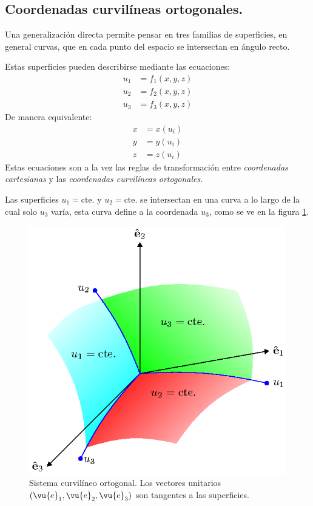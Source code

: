 \subsection{Coordenadas curvilíneas ortogonales.}

Una generalización directa permite pensar en tres familias de superficies, en general curvas, que en cada punto del espacio se intersectan en ángulo recto.
\par
Estas superficies pueden describirse mediante las ecuaciones:
\begin{align*}
u_{1} &= f_{1}(x, y, z) \\
u_{2} &= f_{2}(x, y, z) \\
u_{3} &= f_{3}(x, y, z)
\end{align*}
De manera equivalente:
\begin{align*}
x &= x(u_{i}) \\
y &= y(u_{i}) \\
z &= z(u_{i})
\end{align*}
Estas ecuaciones son a la vez las reglas de transformación entre \emph{coordenadas cartesianas} y las \emph{coordenadas curvilíneas ortogonales}.
\par
Las superficies $u_{1} = \mbox{cte.}$ y $u_{2} = \mbox{cte.}$ se intersectan en una curva a lo largo de la cual solo $u_{3}$ varía, esta curva define a la coordenada $u_{3}$, como se ve en la figura \ref{fig:figura_Sistema_Curvilineo_Ortogonal}.
\begin{figure}[H]
   \centering
   \includegraphics[scale=1]{Imagenes/Sistema_Curvilineo_Ortogonal.eps}
   \caption{Sistema curvilíneo ortogonal. Los vectores unitarios $(\vu{e}_{1}, \vu{e}_{2}, \vu{e}_{3})$ son tangentes a las superficies.}
   \label{fig:figura_Sistema_Curvilineo_Ortogonal}
\end{figure}
